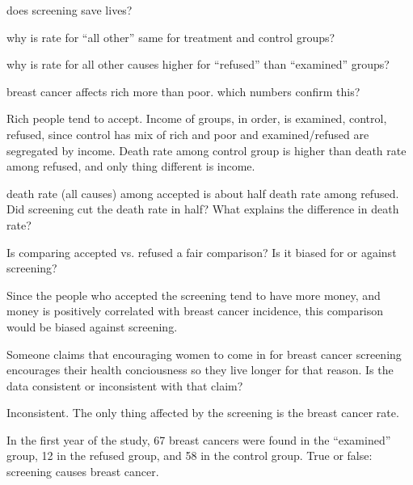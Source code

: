 \documentclass[landscape]{exam}
\begin{document}
  \begin{itemize*}
    \item does screening save lives?
    \item why is rate for ``all other'' same for treatment and control groups?
    \item why is rate for all other causes higher for ``refused'' than
      ``examined'' groups?

    \item breast cancer affects rich more than poor.  which numbers confirm
      this?

      \begin{solution}
        Rich people tend to accept.  Income of groups, in order, is examined,
        control, refused, since control has mix of rich and poor and
        examined/refused are segregated by income.  Death rate among control
        group is higher than death rate among refused, and only thing different
        is income.
      \end{solution}

    \item death rate (all causes) among accepted is about half death rate among
      refused.  Did screening cut the death rate in half?  What explains the
      difference in death rate?

    \item Is comparing accepted vs. refused a fair comparison?  Is it biased for
      or against screening?

      \begin{solution}
        Since the people who accepted the screening tend to have more money, and
        money is positively correlated with breast cancer incidence, this
        comparison would be biased against screening.
      \end{solution}

    \item Someone claims that encouraging women to come in for breast cancer
      screening encourages their health conciousness so they live longer for
      that reason.  Is the data consistent or inconsistent with that claim?

      \begin{solution}
        Inconsistent.  The only thing affected by the screening is the breast
        cancer rate.
      \end{solution}

    \item In the first year of the study, 67 breast cancers were found in the
      ``examined'' group, 12 in the refused group, and 58 in the control group.
      True or false: screening causes breast cancer.


\end{itemize*}
\end{document}
